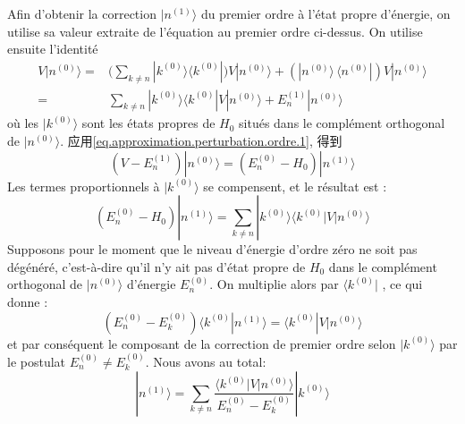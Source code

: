 \documentclass{article}
\begin{document}
Afin d'obtenir la correction $\scriptstyle \mid n^{(1)}\rangle$ du premier ordre \`a l'\'etat propre d'\'energie, on utilise sa valeur extraite de l'\'equation au premier ordre ci-dessus. On utilise ensuite l'identit\'e
$$
\begin{aligned}
V|n^{(0)}\rangle
= & \Big( \sum_{k\ne n} |k^{(0)}\rangle\langle k^{(0)}| \Big) V|n^{(0)}\rangle  + \left(|n^{(0)}\rangle\, \langle n^{(0)}|\right)  V|n^{(0)}\rangle \\
= & \sum_{k\ne n} |k^{(0)}\rangle\langle k^{(0)}| V|n^{(0)}\rangle  + E_n^{(1)} |n^{(0)}\rangle
\end{aligned}
$$
o\`u les $\scriptstyle |k^{(0)}\rangle$ sont les \'etats propres de $\scriptstyle H_0$ situ\'es dans le compl\'ement orthogonal de $\scriptstyle |n^{(0)}\rangle$.
应用\eqref{eq.approximation.perturbation.ordre.1}, 得到
$$
(V - E_n^{(1)})|n^{(0)}\rangle = (E_n^{(0)} - H_0) |n^{(1)}\rangle
$$
Les termes proportionnels \`a $\scriptstyle |k^{(0)}\rangle$ se compensent, et le r\'esultat est :
$$
 \left(E_n^{(0)} - H_0 \right) |n^{(1)}\rangle = \sum_{k \ne n} |k^{(0)}\rangle \langle k^{(0)}|V|n^{(0)} \rangle
$$
Supposons pour le moment que le niveau d'\'energie d'ordre z\'ero ne soit pas d\'eg\'en\'er\'e, c'est-\`a-dire qu'il n'y ait pas d'\'etat propre de $\scriptstyle H_0$ dans le compl\'ement orthogonal de $\scriptstyle |n^{(0)}\rangle$ d'\'energie $\scriptstyle E_n^{(0)}$. On multiplie alors par $\scriptstyle \langle k^{(0)}|$ , ce qui donne :
$$
 \left(E_n^{(0)} - E_k^{(0)}  \right) \langle k^{(0)}|n^{(1)}\rangle =  \langle k^{(0)}|V|n^{(0)} \rangle
$$
et par cons\'equent le composant de la correction de premier ordre selon $\scriptstyle |k^{(0)}\rangle$  par le postulat $\scriptstyle  E_n^{(0)} \ne E_k^{(0)}$. Nous avons au total:
\begin{equation}
 |n^{(1)}\rangle = \sum_{k \ne n} \frac{\langle k^{(0)}|V|n^{(0)} \rangle}{E_n^{(0)} - E_k^{(0)}} |k^{(0)}\rangle
\end{equation}
\end{document}

